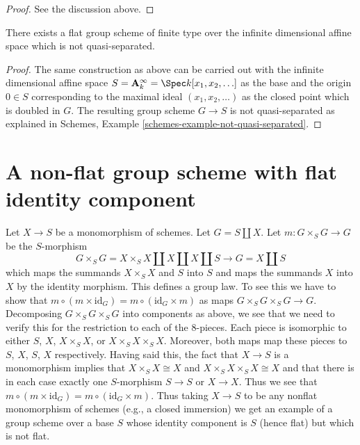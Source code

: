 \begin{proof}
See the discussion above.
\end{proof}

\begin{lemma}
\label{lemma-non-quasi-separated-group-scheme}
There exists a flat group scheme of finite type over the infinite
dimensional affine space which is not quasi-separated.
\end{lemma}

\begin{proof}
The same construction as above can be carried out with the infinite dimensional
affine space $S = \mathbf{A}^\infty_k = \Spec k[x_1, x_2, \ldots]$ as the base
and the origin $0 \in S$ corresponding to the maximal ideal
$(x_1, x_2, \ldots)$ as the closed point which is doubled in $G$.
The resulting group scheme $G \rightarrow S$ is 
not quasi-separated as explained in
Schemes, Example \ref{schemes-example-not-quasi-separated}. 
\end{proof}



\section{A non-flat group scheme with flat identity component}
\label{section-non-flat-group-scheme}

\noindent
Let $X \to S$ be a monomorphism of schemes. Let $G = S \amalg X$.
Let $m : G \times_S G \to G$ be the $S$-morphism
$$
G \times_S G = X \times_S X \amalg X \amalg X \amalg S
\longrightarrow G = X \amalg S
$$
which maps the summands $X \times_S X$ and $S$ into $S$ and
maps the summands $X$ into $X$ by the identity morphism.
This defines a group law. To see this we have to show that
$m \circ (m \times \text{id}_G) = m \circ (\text{id}_G \times m)$
as maps $G \times_S G \times_S G \to G$. Decomposing
$G \times_S G \times_S G$ into components as above, we see that
we need to verify this for the restriction to each of the $8$-pieces.
Each piece is isomorphic to either $S$, $X$, $X \times_S X$, or
$X \times_S X \times_S X$. Moreover, both maps map these pieces
to $S$, $X$, $S$, $X$ respectively. Having said this, the fact that
$X \to S$ is a monomorphism implies that $X \times_S X \cong X$
and $X \times_S X \times_S X \cong X$ and that there is in each case
exactly one $S$-morphism $S \to S$ or $X \to X$. Thus we see
that $m \circ (m \times \text{id}_G) = m \circ (\text{id}_G \times m)$.
Thus taking $X \to S$ to be any
nonflat monomorphism of schemes (e.g., a closed immersion)
we get an example of a group scheme
over a base $S$ whose identity component is $S$ (hence flat)
but which is not flat.

